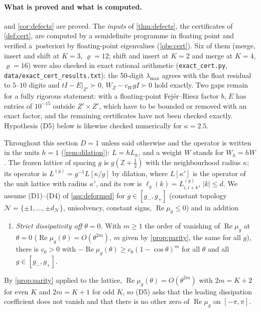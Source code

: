 \documentclass[11pt,a4paper]{article}
\theoremstyle{plain}
\theoremstyle{definition}
\theoremstyle{remark}
\numberwithin{equation}{section}
\newcommand{\Z}{\mathbb{Z}}
\renewcommand{\Re}{\operatorname{Re}}
\begin{document}
\paragraph{What is proved and what is computed.}  and \cref{cor:defects} are proved. The \emph{inputs} of \cref{thm:defects}, the certificates of \cref{def:cert}, are computed by a semidefinite programme in floating point and verified a~posteriori by floating-point eigenvalues (\cref{obs:cert}). Six of them (merge, insert and shift at $K=3$, $\varrho=12$; shift and insert at $K=2$ and merge at $K=4$, $\varrho=16$) were also checked in exact rational arithmetic (\texttt{exact\_cert.py}, \texttt{data/exact\_cert\_results.txt}): the 50-digit $\lambda_{\max}$ agrees with the float residual to $5$--$10$ digits and $tI-E|_{Z'}\succ0$, $W_Z-c_WgI\succ0$ hold exactly. Two gaps remain for a fully rigorous statement: with a floating-point Fej\'er--Riesz factor $b$, $E$ has entries of $10^{-15}$ outside $Z'\times Z'$, which have to be bounded or removed with an exact factor, and the remaining certificates have not been checked exactly. Hypothesis (D5) below is likewise checked numerically for $\kappa=2.5$.

Throughout this section $D=1$ unless said otherwise and the operator is written in the units $h=1$ (\cref{rem:dilation}): $L=hL_h$, and a weight $W$ stands for $W_h=hW$. The frozen lattice of spacing $g$ is $g(\Z+\frac12)$ with the neighbourhood radius $\kappa$; its operator is $L^{(g)}=g^{-1}L[\kappa/g]$ by dilation, where $L[\kappa']$ is the operator of the unit lattice with radius $\kappa'$, and its row is $\ell_g(k)=L^{(g)}_{i,i+k}$, $|k|\le d$. We assume (D1)--(D4) of \cref{ass:deformed} for $g\in[g_-,g_+]$ (constant topology $\mathcal N=\{\pm1,\dots,\pm d_{\mathcal N}\}$, unisolvency, constant signs, $\Re\mu_g\le0$) and in addition
\begin{enumerate}[label=(D\arabic*),start=5]
\item \emph{Strict dissipativity off $\theta=0$.} With $m\ge1$ the order of vanishing of $\Re\mu_g$ at $\theta=0$ ($\Re\mu_g(\theta)=O(\theta^{2m})$, $m$ given by \cref{prop:parity}, the same for all $g$), there is $c_0>0$ with $-\Re\mu_g(\theta)\ge c_0(1-\cos\theta)^m$ for all $\theta$ and all $g\in[g_-,g_+]$.
\end{enumerate}
By \cref{prop:parity} applied to the lattice, $\Re\mu_g(\theta)=O(\theta^{2m})$ with $2m=K+2$ for even $K$ and $2m=K+1$ for odd $K$, so (D5) asks that the leading dissipation coefficient does not vanish and that there is no other zero of $\Re\mu_g$ on $[-\pi,\pi]$.
\end{document}
